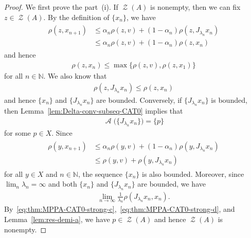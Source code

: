 \documentclass[draft]{amsart}
\numberwithin{equation}{section}
\def\N{\mathbb N}
\DeclareMathOperator{\AC}{\mathcal{A}}
\DeclareMathOperator{\Zer}{\mathcal{Z}}
\theoremstyle{plain}
\theoremstyle{definition}
\theoremstyle{remark}
\begin{document}
\begin{proof}
 We first prove the part~(i). If $\Zer(A)$ is nonempty, then 
 we can fix $z\in \Zer(A)$. By the definition of $\{x_n\}$, we have 
 \begin{align*}
  \begin{split}
  \rho(z, x_{n+1}) 
  &\leq \alpha_n \rho(z, v) + (1-\alpha_n) \rho(z, J_{\lambda_n}x_n) \\  
  &\leq \alpha_n \rho(z, v) + (1-\alpha_n) \rho(z, x_n) 
  \end{split}
 \end{align*}
 and hence 
 \begin{align}\label{eq:thm:MPPA-CAT0-strong-a}
  \rho(z, x_n) \leq \max\{\rho(z, v), \rho(z, x_1)\}
 \end{align}
 for all $n\in \N$. We also know that 
 \begin{align}\label{eq:thm:MPPA-CAT0-strong-b}
  \rho(z, J_{\lambda_n}x_n) \leq \rho(z, x_n)
 \end{align}
 and hence $\{x_n\}$ and $\{J_{\lambda_n}x_n\}$ are bounded. 
 Conversely, if $\{J_{\lambda_n}x_n\}$ is bounded, then Lemma~\ref{lem:Delta-conv-subseq-CAT0} 
 implies that 
 \begin{align}\label{eq:thm:MPPA-CAT0-strong-c}
 \AC\bigl(\{J_{\lambda_n}x_n\}\bigr)=\{p\} 
 \end{align}
 for some $p\in X$. Since 
 \begin{align*}
  \begin{split}
  \rho(y, x_{n+1}) 
  &\leq \alpha_n \rho(y, v) + (1-\alpha_n) \rho(y, J_{\lambda_n}x_n) \\
  &\leq \rho(y, v) + \rho(y, J_{\lambda_n}x_n)
  \end{split}
 \end{align*}
 for all $y\in X$ and $n\in \N$, the sequence $\{x_n\}$ is also bounded. 
 Moreover, since $\lim_n\lambda_n = \infty$ and both $\{x_n\}$ and $\{J_{\lambda_n}x_n\}$ are 
 bounded, we have 
 \begin{align}\label{eq:thm:MPPA-CAT0-strong-d}
  \lim_{n\to \infty} \frac{1}{\lambda_n} \rho(J_{\lambda_n}x_n, x_n).   
 \end{align}
 By~\eqref{eq:thm:MPPA-CAT0-strong-c},~\eqref{eq:thm:MPPA-CAT0-strong-d}, 
 and Lemma~\ref{lem:res-demi-a}, we have 
 $p\in \Zer(A)$ and hence $\Zer(A)$ is nonempty. 
 

\end{proof}
\end{document}
